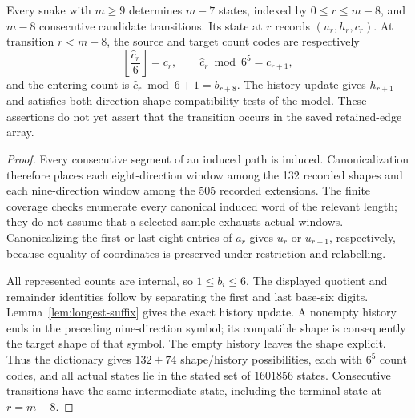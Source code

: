 \begin{proposition}\label{prop:actual-state-sequence}
Every snake with $m\ge9$ determines $m-7$ states, indexed by
$0\le r\le m-8$, and $m-8$ consecutive candidate transitions. Its state at
$r$ records $(u_r,h_r,c_r)$. At transition $r<m-8$, the source and target
count codes are respectively
\[
\left\lfloor\frac{\widehat c_r}{6}\right\rfloor=c_r,
\qquad \widehat c_r\bmod6^5=c_{r+1},
\]
and the entering count is $\widehat c_r\bmod6+1=b_{r+8}$.
The history update gives $h_{r+1}$ and satisfies both direction-shape
compatibility tests of the model. These assertions do not yet assert that
the transition occurs in the saved retained-edge array.
\end{proposition}
\begin{proof}
Every consecutive segment of an induced path is induced. Canonicalization
therefore places each eight-direction window among the 132 recorded shapes
and each nine-direction window among the 505 recorded extensions. The finite
coverage checks enumerate every canonical induced word of the relevant
length; they do not assume that a selected sample exhausts actual windows.
Canonicalizing the first or last eight entries of $a_r$ gives $u_r$ or
$u_{r+1}$, respectively, because equality of coordinates is preserved under
restriction and relabelling.

All represented counts are internal, so $1\le b_i\le6$. The displayed
quotient and remainder identities follow by separating the first and last
base-six digits. Lemma~\ref{lem:longest-suffix} gives the exact history
update. A nonempty history ends in the preceding nine-direction symbol;
its compatible shape is consequently the target shape of that symbol.
The empty history leaves the shape explicit. Thus the dictionary gives
$132+74$ shape/history possibilities, each with $6^5$ count codes, and all
actual states lie in the stated set of $1601856$ states. Consecutive
transitions have the same intermediate state, including the terminal state
at $r=m-8$.
\end{proof}

